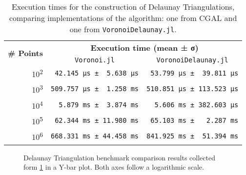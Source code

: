 \begin{table}[htb]
  \caption[Delaunay Triangulation benchmarks]{
    Execution times for the construction of Delaunay Triangulations, comparing
    implementations of the algorithm: one from \ac{CGAL} and one from
    \texttt{VoronoiDelaunay.jl}.}%
  \label{tab:eval.voronoi.bench}
  \centering
  \begin{tabular}{r*{2}{l}}
    \toprule
    \multirow{2}{*}{\textbf{\# Points}}
    & \multicolumn{2}{c}{\textbf{Execution time (mean ± σ)}} \\
    & \multicolumn{1}{c}{\texttt{Voronoi.jl}}
    & \multicolumn{1}{c}{\texttt{VoronoiDelaunay.jl}} \\
    \midrule
    10\textsuperscript{2} & \verb| 42.145 μs ±  5.638 μs|
                          & \verb| 53.799 μs ±  39.811 μs| \\
    10\textsuperscript{3} & \verb|509.757 μs ±  1.258 ms|
                          & \verb|510.851 μs ± 113.523 μs| \\
    10\textsuperscript{4} & \verb|  5.879 ms ±  3.874 ms|
                          & \verb|  5.606 ms ± 382.603 μs| \\
    10\textsuperscript{5} & \verb| 62.344 ms ± 11.980 ms|
                          & \verb| 65.103 ms ±   2.287 ms| \\
    10\textsuperscript{6} & \verb|668.331 ms ± 44.458 ms|
                          & \verb|841.925 ms ±  51.394 ms| \\
    \bottomrule
  \end{tabular}
\end{table}

\begin{figure}[htb]
  \centering
  \caption[Delaunay Triangulation benchmarks]{
    Delaunay Triangulation benchmark comparison results collected form
    \cref{tab:eval.voronoi.bench} in a Y-bar plot.  Both axes follow a
    logarithmic scale.}%
  \label{fig:eval.voronoi.bench}
\end{figure}

